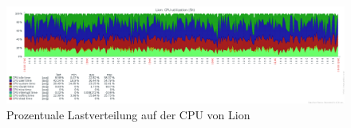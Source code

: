 \begin{figure}[htbp]
\centering
\includegraphics*[width=0.9\linewidth, angle=90]{Abb/ZabbixLion/Standard/CPUStandard20}

\caption{Prozentuale Lastverteilung auf der CPU von Lion}
\label{fig:CPULionStandard}
\end{figure}

%
%

